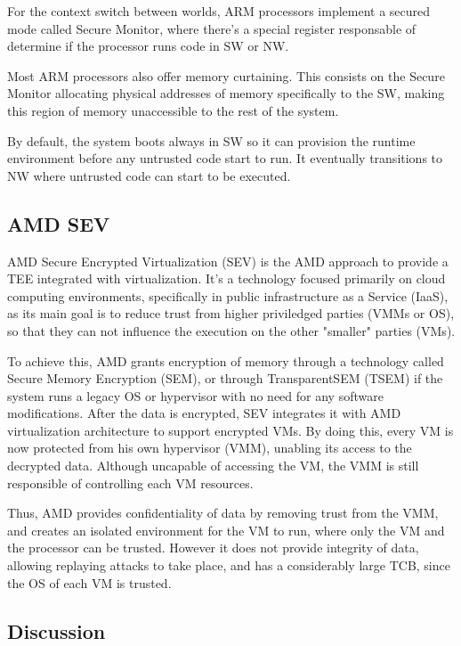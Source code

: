 For the context switch between worlds, ARM processors implement a secured mode called Secure Monitor, where there's a special register responsable of determine if the processor runs code in SW or NW. 

Most ARM processors also offer memory curtaining. This consists on the Secure Monitor allocating physical addresses of memory specifically to the SW, making this region of memory unaccessible to the rest of the system.

By default, the system boots always in SW so it can provision the runtime environment before any untrusted code start to run. It eventually transitions to NW where untrusted code can start to be executed. \cite{armTZPaper}


\subsection{AMD SEV}

AMD Secure Encrypted Virtualization (SEV) is the AMD approach to provide a TEE integrated with virtualization. It's a technology focused primarily on cloud computing environments, specifically in public infrastructure as a Service (IaaS), as its main goal is to reduce trust from higher priviledged parties (VMMs or OS), so that they can not influence the execution on the other "smaller" parties (VMs). 

To achieve this, AMD grants encryption of memory through a technology called Secure Memory Encryption (SEM), or through TransparentSEM (TSEM) if the system runs a legacy OS or hypervisor with no need for any software modifications.
After the data is encrypted, SEV integrates it with AMD virtualization architecture to support encrypted VMs. By doing this, every VM is now protected from his own hypervisor (VMM), unabling its access to the decrypted data. Although uncapable of accessing the VM, the VMM is still responsible of controlling each VM resources. \cite{amdPaper}

Thus, AMD provides confidentiality of data by removing trust from the VMM, and creates an isolated environment for the VM to run, where only the VM and the processor can be trusted. However it does not provide integrity of data, allowing replaying attacks to take place, and has a considerably large TCB, since the OS of each VM is trusted. \cite{amdSEVPaper}


\subsection{Discussion}

